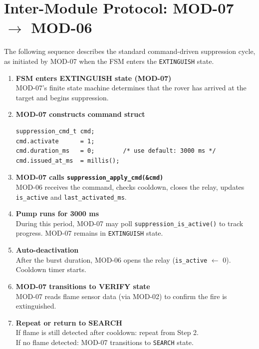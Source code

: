 \documentclass[12pt]{article}
\begin{document}
\section{Inter-Module Protocol: MOD-07 \texorpdfstring{$\rightarrow$}{->} MOD-06}

The following sequence describes the standard command-driven suppression cycle, as initiated by MOD-07 when the FSM enters the \texttt{EXTINGUISH} state.

\begin{enumerate}[leftmargin=2em, label=\textbf{Step \arabic*.}]

  \item \textbf{FSM enters EXTINGUISH state (MOD-07)} \\
        MOD-07's finite state machine determines that the rover has arrived at the target and begins suppression.

  \item \textbf{MOD-07 constructs command struct}
\begin{lstlisting}[style=cstyle, numbers=none]
suppression_cmd_t cmd;
cmd.activate      = 1;
cmd.duration_ms   = 0;        /* use default: 3000 ms */
cmd.issued_at_ms  = millis();
\end{lstlisting}

  \item \textbf{MOD-07 calls \texttt{suppression\_apply\_cmd(\&cmd)}} \\
        MOD-06 receives the command, checks cooldown, closes the relay, updates \texttt{is\_active} and \texttt{last\_activated\_ms}.

  \item \textbf{Pump runs for 3000 ms} \\
        During this period, MOD-07 may poll \texttt{suppression\_is\_active()} to track progress. MOD-07 remains in \texttt{EXTINGUISH} state.

  \item \textbf{Auto-deactivation} \\
        After the burst duration, MOD-06 opens the relay (\texttt{is\_active} $\leftarrow$ 0). Cooldown timer starts.

  \item \textbf{MOD-07 transitions to VERIFY state} \\
        MOD-07 reads flame sensor data (via MOD-02) to confirm the fire is extinguished.

  \item \textbf{Repeat or return to SEARCH} \\
        If flame is still detected after cooldown: repeat from Step 2. \\
        If no flame detected: MOD-07 transitions to \texttt{SEARCH} state.

\end{enumerate}
\end{document}
